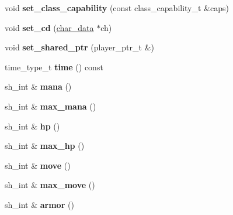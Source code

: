 \begin{DoxyCompactItemize}
\item 
\mbox{\label{classmods_1_1player_ac7a081ac7ab4ed0a136ae31768c308e0}} 
void {\bfseries set\+\_\+class\+\_\+capability} (const class\+\_\+capability\+\_\+t \&caps)
\item 
\mbox{\label{classmods_1_1player_a706d5f48fe7b8e3f3013e8a4e89026ea}} 
void {\bfseries set\+\_\+cd} (\hyperlink{structchar__data}{char\+\_\+data} $\ast$ch)
\item 
\mbox{\label{classmods_1_1player_a6c51e26561ea4c876295da2d3702b724}} 
void {\bfseries set\+\_\+shared\+\_\+ptr} (player\+\_\+ptr\+\_\+t \&)
\item 
\mbox{\label{classmods_1_1player_ad60fbd4f0aaa6d3ee9c98dddb3ebc126}} 
time\+\_\+type\+\_\+t {\bfseries time} () const
\item 
\mbox{\label{classmods_1_1player_a51c04c6fbc693242bff75b4c5f7a6f20}} 
sh\+\_\+int \& {\bfseries mana} ()
\item 
\mbox{\label{classmods_1_1player_a5f33702911d5388a841c18fea85fc1f4}} 
sh\+\_\+int \& {\bfseries max\+\_\+mana} ()
\item 
\mbox{\label{classmods_1_1player_aeb9f1fcb518628ff9c9e5b801edbefa2}} 
sh\+\_\+int \& {\bfseries hp} ()
\item 
\mbox{\label{classmods_1_1player_a53bab528eede0206aaabac039eae01f1}} 
sh\+\_\+int \& {\bfseries max\+\_\+hp} ()
\item 
\mbox{\label{classmods_1_1player_a55c765377a7065cce535eb1513cde195}} 
sh\+\_\+int \& {\bfseries move} ()
\item 
\mbox{\label{classmods_1_1player_aecc04f7e551f70f6273f117ac1b7ca08}} 
sh\+\_\+int \& {\bfseries max\+\_\+move} ()
\item 
\mbox{\label{classmods_1_1player_a7d381a08bf3e27ce1a6984e1cb29c7bd}} 
sh\+\_\+int \& {\bfseries armor} ()
\item 

\end{DoxyCompactItemize}

